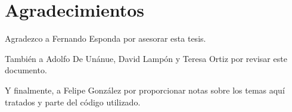 \chapter*{Agradecimientos}

Agradezco a Fernando Esponda por asesorar esta tesis.

También a Adolfo De Unánue, David Lampón y Teresa Ortiz por revisar este documento.

Y finalmente, a Felipe González por proporcionar notas sobre los temas aquí tratados y parte del código utilizado.

